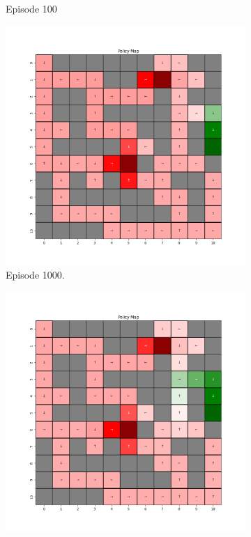 \documentclass{assignment}
\begin{document}
\begin{figure}[H]
\begin{subfigure}{0.3\textwidth}
    \caption{Episode 100}
    \end{subfigure}
    \begin{subfigure}{0.3\textwidth}
        \includegraphics[width=\textwidth]{figures/policy_td/alpha_sweep/policy_alpha_0.001_gamma_0.95_epsilon_0.2_iteration_1000.png}
    \caption{Episode 1000.}
    \end{subfigure}\hfill
    \begin{subfigure}{0.3\textwidth}
        \includegraphics[width=\textwidth]{figures/policy_td/alpha_sweep/policy_alpha_0.001_gamma_0.95_epsilon_0.2_iteration_5000.png}

\end{subfigure}
\end{figure}
\end{document}

